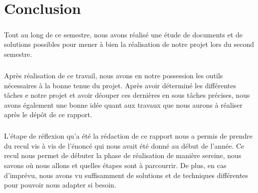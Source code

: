 \chapter*{Conclusion}

\paragraph{}
Tout au long de ce semestre, nous avons réalisé une étude de documents et de solutions possibles pour mener à bien la réalisation de notre projet lors du second semestre.

\paragraph{}
Après réalisation de ce travail, nous avons en notre possession les outils nécessaires à la bonne tenue du projet. Après avoir déterminé les différentes tâches e notre projet et avoir déouper ces dernières en sous tâches précises, nous avons également une bonne idée quant aux travaux que nous aurons à réaliser après le dépôt de ce rapport. 

\paragraph{}
L'étape de réflexion qu'a été la rédaction de ce rapport nous a permis de prendre du recul vis à vis de l'énoncé qui nous avait été donné au début de l'année. Ce recul nous permet de débuter la phase de réalisation de manière sereine, nous savons où nous allons et quelles étapes sont à parcourrir. De plus, en cas d'imprévu, nous avons vu suffisamment de solutions et de techniques différentes pour pouvoir nous adapter si besoin.

\paragraph{}

